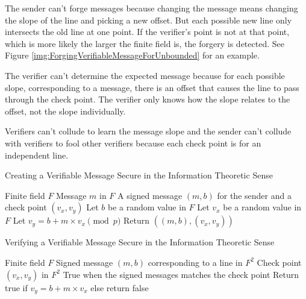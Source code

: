 \documentclass{dalcsthesis}
\begin{document}
The sender can't forge messages because changing the message means changing the slope of the line and picking a new offset. But each possible new line only intersects the old line at one point. If the verifier's point is not at that point, which is more likely the larger the finite field is, the forgery is detected. See Figure \ref{img:ForgingVerifiableMessageForUnbounded} for an example.

The verifier can't determine the expected message because for each possible slope, corresponding to a message, there is an offset that causes the line to pass through the check point. The verifier only knows how the slope relates to the offset, not the slope individually.

Verifiers can't collude to learn the message slope and the sender can't collude with verifiers to fool other verifiers because each check point is for an independent line.

\begin{algorithm}
  \caption{Creating a Verifiable Message Secure in the Information Theoretic Sense}
  \label{alg:CreatingVerifiableMessageForUnbounded}
  \begin{algorithmic}
    \INPUT Finite field $F$
    \INPUT Message $m$ in $F$
    \OUTPUT A signed message $(m, b)$ for the sender and a check point $(v_x, v_y)$
    \STATE Let $b$ be a random value in $F$ 
    \STATE Let $v_x$ be a random value in $F$
    \STATE Let $v_y = b + m \times v_x \pmod{p}$
    \STATE Return $((m, b), (v_x, v_y))$
  \end{algorithmic}
\end{algorithm}
\begin{algorithm}
  \caption{Verifying a Verifiable Message Secure in the Information Theoretic Sense}
  \label{alg:VerifyMessageForUnbounded}
  \begin{algorithmic}
    \INPUT Finite field $F$
    \INPUT Signed message $(m, b)$ corresponding to a line in $F^2$
    \INPUT Check point $(v_x, v_y)$ in $F^2$
    \OUTPUT True when the signed messages matches the check point
    \STATE Return true if $v_y = b + m \times v_x$ else return false
  \end{algorithmic}
\end{algorithm}
\end{document}
